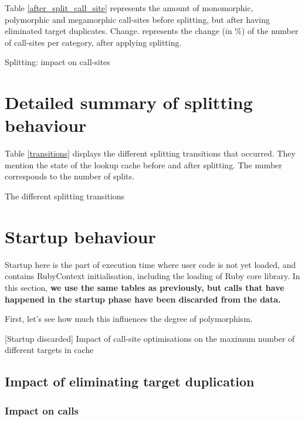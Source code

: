\documentclass[preprint]{acmart}
\let\StartupBeforeAfterSplitSites\BeforeAfterSplitSites
\let\StartupSplittingTransitions\SplittingTransitions
\let\NoStartupExtent\Extent
\begin{document}
Table \ref{after_split_call_site} represents the amount of monomorphic, polymorphic and megamorphic call-sites before splitting, but after having eliminated target duplicates.
Change. represents the change (in \%) of the number of call-sites per category, after applying splitting.

\begin{table}[h!]
	\centering
	\StartupBeforeAfterSplitSites
	\caption{Splitting: impact on call-sites}
	\label{after_split_call_site}
\end{table}

\section{Detailed summary of splitting behaviour}

Table \ref{transitions} displays the different splitting transitions that occurred. They mention the state of the lookup cache before and after splitting. The number corresponds to the number of splits.

\begin{table}[h!]
	\centering
	\StartupSplittingTransitions
	\caption{The different splitting transitions}
	\label{transitions}
\end{table}

\section{Startup behaviour}
Startup here is the part of execution time where user code is not yet loaded, and contains RubyContext initialisation, including the loading of Ruby core library. In this section, \textbf{we use the same tables as previously, but calls that have happened in the startup phase have been discarded from the data.}

First, let's see how much this influences the degree of polymorphism.

\begin{table}[h!]
	\centering
	\NoStartupExtent
	\caption{[Startup discarded] Impact of call-site optimisations on the maximum number of different targets in cache}
	\label{transitions}
\end{table}


\subsection{Impact of eliminating target duplication}
\subsubsection{\textbf{Impact on calls}}
\end{document}
